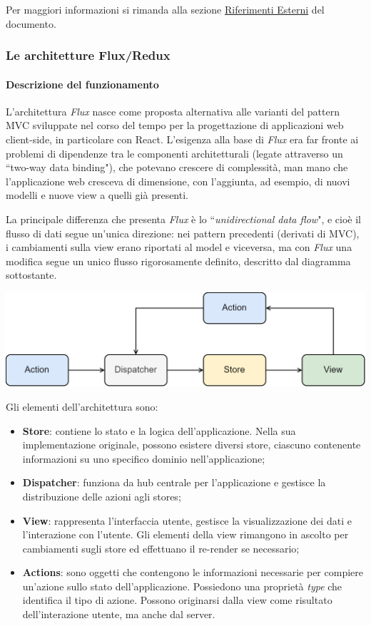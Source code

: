 Per maggiori informazioni si rimanda alla sezione \hyperref[sec:ref_esterni]{Riferimenti Esterni} del documento.

\subsubsection{Le architetture Flux/Redux}
\paragraph{Descrizione del funzionamento}
L'architettura \textit{Flux} nasce come proposta alternativa alle varianti del pattern MVC sviluppate nel corso del tempo per la progettazione di applicazioni web client-side, in particolare con React. L'esigenza alla base di \textit{Flux} era far fronte ai problemi di dipendenze tra le componenti architetturali (legate attraverso un ``two-way data binding"), che potevano crescere di complessità, man mano che l'applicazione web cresceva di dimensione, con l'aggiunta, ad esempio, di nuovi modelli e nuove view a quelli già presenti.
\par La principale differenza che presenta \textit{Flux} è lo ``\textit{unidirectional data flow}", e cioè il flusso di dati segue un'unica direzione: nei pattern precedenti (derivati di MVC), i cambiamenti sulla view erano riportati al model e viceversa, ma con \textit{Flux} una modifica segue un unico flusso rigorosamente definito, descritto dal diagramma sottostante.
\begin{center}
    \includegraphics[scale=0.8]{images/flux.png}
\end{center}
\noindent Gli elementi dell'architettura sono:
\begin{itemize}
    \item \textbf{Store}: contiene lo stato e la logica dell'applicazione. Nella sua implementazione originale, possono esistere diversi store, ciascuno contenente informazioni su uno specifico dominio nell'applicazione;
    \item \textbf{Dispatcher}: funziona da hub centrale per l'applicazione e gestisce la distribuzione delle azioni agli stores;
    \item \textbf{View}: rappresenta l'interfaccia utente, gestisce la visualizzazione dei dati e l'interazione con l'utente. Gli elementi della view rimangono in ascolto per cambiamenti sugli store ed effettuano il re-render se necessario;
    \item \textbf{Actions}: sono oggetti che contengono le informazioni necessarie per compiere un'azione sullo stato dell'applicazione. Possiedono una proprietà \textit{type} che identifica il tipo di azione. Possono originarsi dalla view come risultato dell'interazione utente, ma anche dal server. 
\end{itemize}
